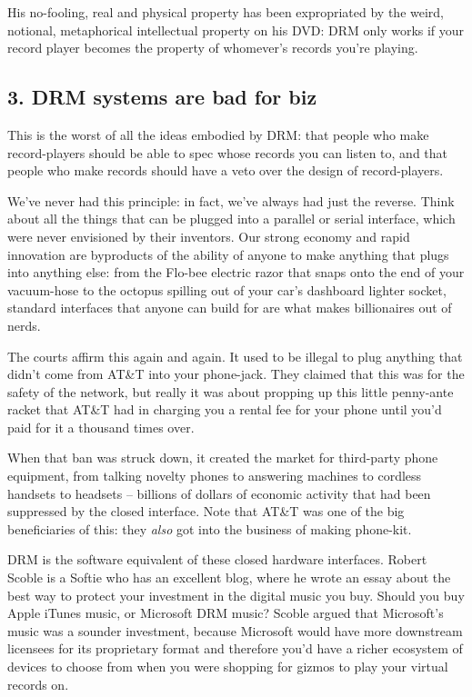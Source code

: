 His no-fooling, real and physical property has been expropriated by
the weird, notional, metaphorical intellectual property on his DVD:
DRM only works if your record player becomes the property of
whomever's records you're playing.

\subsection{3. DRM systems are bad for biz}

This is the worst of all the ideas embodied by DRM: that people who
make record-players should be able to spec whose records you can
listen to, and that people who make records should have a veto over
the design of record-players.

We've never had this principle: in fact, we've always had just the
reverse. Think about all the things that can be plugged into a
parallel or serial interface, which were never envisioned by their
inventors. Our strong economy and rapid innovation are byproducts
of the ability of anyone to make anything that plugs into anything
else: from the Flo-bee electric razor that snaps onto the end of
your vacuum-hose to the octopus spilling out of your car's
dashboard lighter socket, standard interfaces that anyone can build
for are what makes billionaires out of nerds.

The courts affirm this again and again. It used to be illegal to
plug anything that didn't come from AT\&T into your phone-jack.
They claimed that this was for the safety of the network, but
really it was about propping up this little penny-ante racket that
AT\&T had in charging you a rental fee for your phone until you'd
paid for it a thousand times over.

When that ban was struck down, it created the market for
third-party phone equipment, from talking novelty phones to
answering machines to cordless handsets to headsets -- billions of
dollars of economic activity that had been suppressed by the closed
interface. Note that AT\&T was one of the big beneficiaries of
this: they \emph{also} got into the business of making
phone-kit.

DRM is the software equivalent of these closed hardware interfaces.
Robert Scoble is a Softie who has an excellent blog, where he wrote
an essay about the best way to protect your investment in the
digital music you buy. Should you buy Apple iTunes music, or
Microsoft DRM music? Scoble argued that Microsoft's music was a
sounder investment, because Microsoft would have more downstream
licensees for its proprietary format and therefore you'd have a
richer ecosystem of devices to choose from when you were shopping
for gizmos to play your virtual records on.

